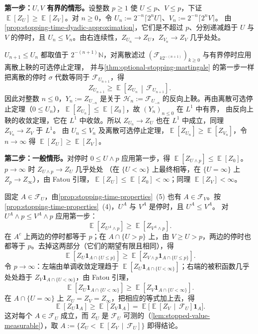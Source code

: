 \documentclass[UTF8,11pt,a4paper,oneside,fontset=fandol]{ctexrep}
\makeatletter
\numberwithin{equation}{section}
\theoremstyle{zhthm}
\renewenvironment{proof}[1][\proofname]{\par
  \pushQED{\qed}%
  \normalfont\topsep6\p@\@plus6\p@\relax
  \trivlist
  \item[\hskip\labelsep\bfseries#1\hspace{0.5em}]\ignorespaces
}{%
  \popQED\endtrivlist\@endpefalse
}
\renewcommand{\proofname}{证明}
\newcommand{\N}{\mathbb{N}}
\newcommand{\F}{\mathcal{F}}
\newcommand{\Hcal}{\mathcal{H}}
\DeclareMathOperator{\E}{\mathbb{E}}
\newcommand{\ind}[1]{\mathbf{1}_{#1}}
\newcommand{\Econd}[2]{%
  \E\!\left[#1\,\middle|\,#2\right]}
\makeatother
\begin{document}
\begin{proof}
\textbf{第一步：$U,V$ 有界的情形。}设整数 $p\ge1$ 使 $U\le p$、$V\le p$，下证 $\E[Z_U]\ge\E[Z_V]$。对 $n\ge0$，令 $U_n:=2^{-n}\lceil2^nU\rceil$、$V_n:=2^{-n}\lceil2^nV\rceil$。
由\cref{prop:stopping-time-dyadic-approximation}，它们是不超过 $p$、分别递减趋于 $U$ 与 $V$ 的停时，且 $U_n\le V_n$。由右连续性，$Z_{U_n}\to Z_U$，$Z_{V_n}\to Z_V$ 几乎处处。

$U_{n+1}\le U_n$ 都取值于 $2^{-(n+1)}\N$，对离散滤过 $(\F_{k2^{-(n+1)}})_{k\ge0}$ 与有界停时应用离散上鞅的可选停止定理\cite[附录 A2]{LeGall2016}，
并与\cref{thm:optional-stopping-martingale} 的第一步一样把离散的停时 $\sigma$ 代数等同于 $\F_{U_{n+1}}$，得
\[
  Z_{U_{n+1}}\ge\Econd{Z_{U_n}}{\F_{U_{n+1}}}.
\]
因此对整数 $n\le0$，$Y_n:=Z_{U_{-n}}$ 是关于 $\Hcal_n:=\F_{U_{-n}}$ 的反向上鞅。再由离散可选停止定理（$0\le U_n$），$\E[Z_{U_n}]\le\E[Z_0]$，故 $(Y_n)_{n\le0}$ 在 $L^1$ 中有界，
由反向上鞅的收敛定理\cite[附录 A2]{LeGall2016}，它在 $L^1$ 中收敛。所以 $Z_{U_n}\to Z_U$ 也在 $L^1$ 中成立，同理 $Z_{V_n}\to Z_V$ 于 $L^1$。
由 $U_n\le V_n$ 及离散可选停止定理，$\E[Z_{U_n}]\ge\E[Z_{V_n}]$，令 $n\to\infty$ 得 $\E[Z_U]\ge\E[Z_V]$。

\textbf{第二步：一般情形。}对停时 $0\le U\wedge p$ 应用第一步，得 $\E[Z_{U\wedge p}]\le\E[Z_0]$。$p\to\infty$ 时 $Z_{U\wedge p}\to Z_U$ 几乎处处
（在 $\{U<\infty\}$ 上最终相等，在 $\{U=\infty\}$ 上 $Z_p\to Z_\infty$），由 Fatou 引理，$\E[Z_U]\le\E[Z_0]<\infty$；同理 $\E[Z_V]<\infty$。

固定 $A\in\F_U$，由\cref{prop:stopping-time-properties}~(5) 也有 $A\in\F_V$。按\cref{prop:stopping-time-properties}~(4)，$U^A$ 与 $V^A$ 是停时，且 $U^A\le V^A$。
对 $U^A\wedge p\le V^A\wedge p$ 应用第一步：
\[
  \E[Z_{U^A\wedge p}]\ge\E[Z_{V^A\wedge p}].
\]
在 $A^c$ 上两边的停时都等于 $p$；在 $A\cap\{U>p\}$ 上，由 $V\ge U>p$，两边的停时也都等于 $p$。去掉这两部分（它们的期望有限且相同），得
\[
  \E[Z_U\ind{A\cap\{U\le p\}}]\ge\E[Z_{V\wedge p}\ind{A\cap\{U\le p\}}].
\]
令 $p\to\infty$：左端由单调收敛定理趋于 $\E[Z_U\ind{A\cap\{U<\infty\}}]$；右端的被积函数几乎处处趋于 $Z_V\ind{A\cap\{U<\infty\}}$，由 Fatou 引理，
\[
  \E[Z_U\ind{A\cap\{U<\infty\}}]\ge\E[Z_V\ind{A\cap\{U<\infty\}}].
\]
在 $A\cap\{U=\infty\}$ 上 $Z_U=Z_V=Z_\infty$，把相应的等式加上去，得
\[
  \E[Z_U\ind A]\ge\E[Z_V\ind A]=\E\bigl[\Econd{Z_V}{\F_U}\ind A\bigr].
\]
这对每个 $A\in\F_U$ 成立，而 $Z_U$ 是 $\F_U$ 可测的（\cref{lem:stopped-value-measurable}），取 $A:=\{Z_U<\Econd{Z_V}{\F_U}\}$ 即得结论。
\end{proof}
\end{document}

